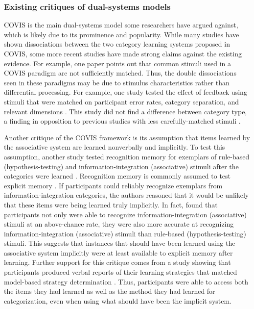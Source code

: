 \documentclass[../dissertation.tex]{subfiles}
\begin{document}
\subsubsection{Existing critiques of dual-systems models}

	COVIS is the main dual-systems model some researchers have argued against, which is likely due to its prominence and popularity. While many studies have shown dissociations between the two category learning systems proposed in COVIS, some more recent studies have made strong claims against the existing evidence. For example, one paper points out that common stimuli used in a COVIS paradigm are not sufficiently matched. Thus, the double dissociations seen in these paradigms may be due to stimulus characteristics rather than differential processing. For example, one study tested the effect of feedback using stimuli that were matched on participant error rates, category separation, and relevant dimensions \citep{Edmunds2015}. This study did not find a difference between category type, a finding in opposition to previous studies with less carefully-matched stimuli \citep{Ashby2002, Maddox2003}. \par 
	Another critique of the COVIS framework is its assumption that items learned by the associative system are learned nonverbally and implicitly. To test this assumption, another study tested recognition memory for exemplars of rule-based (hypothesis-testing) and information-integration (associative) stimuli after the categories were learned \citep{Edmunds2016}. Recognition memory is commonly assumed to test explicit memory \citep{Gabrieli1995}. If participants could reliably recognize exemplars from information-integration categories, the authors reasoned that it would be unlikely that these items were being learned truly implicitly. In fact, \citet{Edmunds2016} found that participants not only were able to recognize information-integration (associative) stimuli at an above-chance rate, they were also more accurate at recognizing information-integration (associative) stimuli than rule-based (hypothesis-testing) stimuli. This suggests that instances that should have been learned using the associative system implicitly were at least available to explicit memory after learning. Further support for this critique comes from a study showing that participants produced verbal reports of their learning strategies that matched model-based strategy determination \citep{Edmunds2015}. Thus, participants were able to access both the items they had learned as well as the method they had learned for categorization, even when using what should have been the implicit system.  \par 
\end{document}
